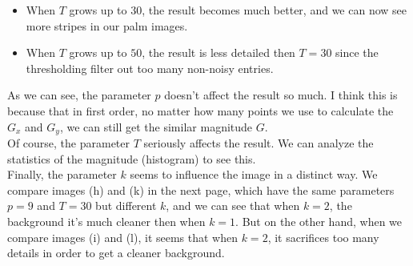 \documentclass{article}
\begin{document}
\begin{enumerate}[label=(\alph*)]
\begin{itemize}
        \item When $T$ grows up to $30$, the result becomes much better, and we can now see more stripes in our palm images.

        \item When $T$ grows up to $50$, the result is less detailed then $T = 30$ since the thresholding filter out too many non-noisy entries.
    \end{itemize}

    As we can see, the parameter $p$ doesn't affect the result so much. I think this is because that in first order, no matter how many points we use to calculate the $G_x$ and $G_y$, we can still get the similar magnitude $G$. \\

    Of course, the parameter $T$ seriously affects the result. We can analyze the statistics of the magnitude (histogram) to see this. \\

    Finally, the parameter $k$ seems to influence the image in a distinct way. We compare images (h) and (k) in the next page, which have the same parameters $p = 9$ and $T = 30$ but different $k$, and we can see that when $k = 2$, the background it's much cleaner then when $k = 1$. But on the other hand, when we compare images (i) and (l), it seems that when $k = 2$, it sacrifices too many details in order to get a cleaner background.


\end{enumerate}
\end{document}
